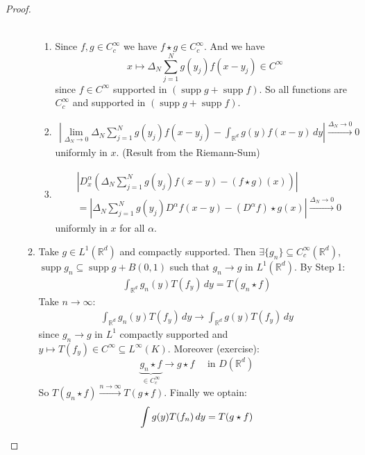 \documentclass{report}
\theoremstyle{tommy}
\newcommand{\supp}{\operatorname{supp}}
\begin{document}
\begin{proof}
\begin{enumerate}[label=\alph*)]
\begin{enumerate}[label=Step \arabic*:]
\begin{align*}
        \end{align*}
        \begin{enumerate}[label=\arabic*)]
          \item Since \(f, g \in C_c^\infty\) we have \(f \star g \in C_c^\infty\). And we have \[x \mapsto \Delta_N \sum_{j=1}^N g(y_j) f(x-y_j) \in C^\infty\] since \(f \in C^\infty\) supported in \((\supp g + \supp f)\). So all functions are \(C_c^\infty\) and supported in \((\supp g + \supp f)\).
          \item 
          \begin{align*}
            \left| \lim_{\Delta_N \to 0} \Delta_N \sum_{j=1}^N g(y_j) f(x-y_j) - \int_{\mathbb{R}^d} g(y) f(x-y) \, dy \right| \xrightarrow{\Delta_N \to 0} 0
          \end{align*}
          uniformly in \(x\). (Result from the Riemann-Sum)
          \item \begin{align*}
            &\left| D_x^\alpha(\Delta_N \sum_{j=1}^N g(y_j) f(x-y) - (f \star g)(x)) \right| \\
            &= \left| \Delta_N \sum_{j=1}^N g(y_j) D^\alpha f(x-y) - (D^\alpha f)\star g(x) \right| \xrightarrow{\Delta_N \to 0} 0
          \end{align*}
          uniformly in \(x\) for all \(\alpha\).
        \end{enumerate}
        \item Take \(g \in L^1(\mathbb{R}^d)\) and compactly supported. Then \(\exists \{g_n\} \subseteq C_c^\infty(\mathbb{R}^d)\), \(\supp g_n \subseteq \supp g + B(0,1)\) such that \(g_n \to g\) in \(L^1(\mathbb{R}^d)\). By Step 1: 
        \begin{align*}
          \int_{\mathbb{R}^d} g_n(y) T(f_y) \, dy = T(g_n \star f)
        \end{align*}
        Take \(n \to \infty\):
        \begin{align*}
          \int_{\mathbb{R}^d} g_n(y) T(f_y) \, dy \to \int_{\mathbb{R}^d} g(y) T(f_y) \, dy
        \end{align*}
        since \(g_n \to g\) in \(L^1\) compactly supported and \(y \mapsto T(f_y) \in C^\infty \subseteq L^\infty(K)\). Moreover (exercise):
        \[\underbrace{g_n \star f}_{\in C_c^\infty} \to g \star f \quad \text{ in } D(\mathbb{R}^d)\]
        So \(T(g_n \star f) \xrightarrow{n \to \infty} T(g \star f)\).
        Finally we optain:
        \[\int g(y) T(f_n) \, dy = T(g \star f)\qedhere\] 
      \end{enumerate}
  \end{enumerate}
  \end{proof}
  
\end{document}

